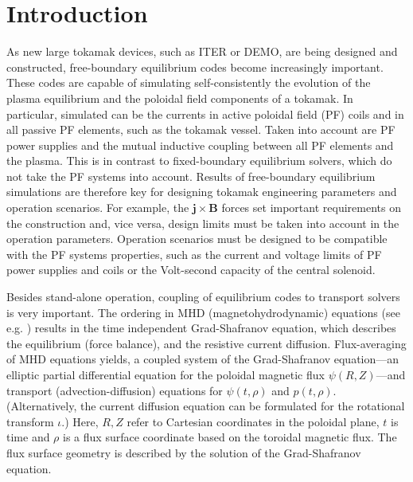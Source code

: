 
\section{Introduction} %
\label{sec:intro}

As new large tokamak devices, such as ITER or DEMO, are being designed and constructed, free-boundary equilibrium codes become increasingly important. These codes are capable of simulating self-consistently the evolution of the plasma equilibrium and the poloidal field components of a tokamak. In particular, simulated can be the currents in active poloidal field (PF) coils and in all passive PF elements, such as the tokamak vessel. Taken into account are PF power supplies and the mutual inductive coupling between all PF elements and the plasma. This is in contrast to fixed-boundary equilibrium solvers, which do not take the PF systems into account. Results of free-boundary equilibrium simulations are therefore key for designing tokamak engineering parameters and operation scenarios. For example, the ${\mathbf{j}} \times {\mathbf{B}}$ forces set important requirements on the construction and, vice versa, design limits must be taken into account in the operation parameters. Operation scenarios must be designed to be compatible with the PF systems properties, such as the current and voltage limits of PF power supplies and coils or the Volt-second capacity of the central solenoid.

Besides stand-alone operation, coupling of equilibrium codes to transport solvers is very important. The ordering in MHD (magnetohydrodynamic) equations (see e.g. \cite{Jardin2011}) results in the time independent Grad-Shafranov equation, which describes the equilibrium (force balance), and the resistive current diffusion. Flux-averaging of MHD equations yields, a coupled system of the Grad-Shafranov equation---an elliptic partial differential equation for the poloidal magnetic flux $\psi\left( R,Z \right)$---and transport (advection-diffusion) equations for $\psi\left( t,\rho \right)$ and $p\left( t,\rho \right)$. (Alternatively, the current diffusion equation can be formulated for the rotational transform $\iota$.) Here, $R,Z$ refer to Cartesian coordinates in the poloidal plane, $t$ is time and $\rho$ is a flux surface coordinate based on the toroidal magnetic flux. The flux surface geometry is described by the solution of the Grad-Shafranov equation. 

